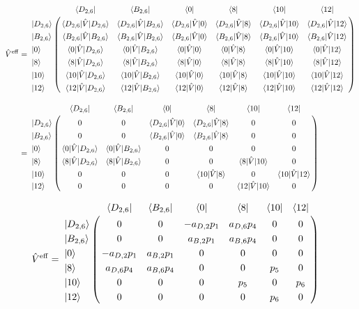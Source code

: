 \begin{align}
     \hat{V}^{\rm{eff}}&=\bordermatrix{
    & \bra{D_{2,6}}&  \bra{B_{2,6}} &\bra{0} &  \bra{8} &  \bra{10} &\bra{12}\cr
   \ket{D_{2,6}}&\langle{D_{2,6}|\hat{V}|D_{2,6}}\rangle&\langle{D_{2,6}|\hat{V}|B_{2,6}}\rangle
   &\langle{D_{2,6}|\hat{V}|0}\rangle&\langle{D_{2,6}|\hat{V}|8}\rangle
   &\langle{D_{2,6}|\hat{V}|10}\rangle&\langle{D_{2,6}|\hat{V}|12}\rangle\cr
\ket{B_{2,6}}&\langle{B_{2,6}|\hat{V}|B_{2,6}}\rangle&\langle{B_{2,6}|\hat{V}|B_{2,6}}\rangle
   &\langle{B_{2,6}|\hat{V}|0}\rangle&\langle{B_{2,6}|\hat{V}|8}\rangle
   &\langle{B_{2,6}|\hat{V}|10}\rangle&\langle{B_{2,6}|\hat{V}|12}\rangle\cr
  \ket{0}
  &\langle{0|\hat{V}|D_{2,6}}\rangle&\langle{0|\hat{V}|B_{2,6}}\rangle
  &\langle{0|\hat{V}|0}\rangle&\langle{0|\hat{V}|8}\rangle
  &\langle{0|\hat{V}|10}\rangle&\langle{0|\hat{V}|12}\rangle\cr
  \ket{8}
  &\langle{8|\hat{V}|D_{2,6}}\rangle&\langle{8|\hat{V}|B_{2,6}}\rangle
  &\langle{8|\hat{V}|0}\rangle&\langle{8|\hat{V}|8}\rangle
   &\langle{8|\hat{V}|10}\rangle
   &\langle{8|\hat{V}|12}\rangle\cr
  \ket{10}&\langle{10|\hat{V}|D_{2,6}}\rangle&\langle{10|\hat{V}|B_{2,6}}\rangle
   &\langle{10|\hat{V}|0}\rangle&\langle{10|\hat{V}|8}\rangle
   &\langle{10|\hat{V}|10}\rangle&\langle{10|\hat{V}|12}\rangle\cr
  \ket{12}&\langle{12|\hat{V}|D_{2,6}}\rangle&\langle{12|\hat{V}|B_{2,6}}\rangle
   &\langle{12|\hat{V}|0}\rangle&\langle{12|\hat{V}|8}\rangle
   &\langle{12|\hat{V}|10}\rangle&\langle{12|\hat{V}|12}\rangle\cr}
   \nn[10pt]
   &=\bordermatrix{
    & \bra{D_{2,6}}&  \bra{B_{2,6}} &\bra{0} &  \bra{8} &  \bra{10} &\bra{12}\cr
   \ket{D_{2,6}}&0&0
   &\langle{D_{2,6}|\hat{V}|0}\rangle&\langle{D_{2,6}|\hat{V}|8}\rangle
   &0&0\cr
\ket{B_{2,6}}&0&0
   &\langle{B_{2,6}|\hat{V}|0}\rangle&\langle{B_{2,6}|\hat{V}|8}\rangle
   &0&0\cr
  \ket{0}
  &\langle{0|\hat{V}|D_{2,6}}\rangle&\langle{0|\hat{V}|B_{2,6}}\rangle
  &0&0
  &0&0\cr
  \ket{8}
  &\langle{8|\hat{V}|D_{2,6}}\rangle&\langle{8|\hat{V}|B_{2,6}}\rangle
  &0&0
   &\langle{8|\hat{V}|10}\rangle
   &0\cr
  \ket{10}&0&0
   &0&\langle{10|\hat{V}|8}\rangle
   &0&\langle{10|\hat{V}|12}\rangle\cr
  \ket{12}&0&0
   &0&0
   &\langle{12|\hat{V}|10}\rangle&0\cr}
\end{align}


\begin{align}
     \hat{V}^{\rm{eff}}&=\bordermatrix{
    & \bra{D_{2,6}}&  \bra{B_{2,6}} &\bra{0} &  \bra{8} &  \bra{10} &\bra{12}\cr
   \ket{D_{2,6}}
   &0&0
   &-a_{D,2}p_1&a_{D,6}p_4
   &0&0\cr
\ket{B_{2,6}}&0&0
   &a_{B,2}p_1&a_{B,6}p_4
   &0&0\cr
  \ket{0}
  &-a_{D,2}p_1&a_{B,2}p_1
  &0&0
  &0&0\cr
  \ket{8}
  &a_{D,6}p_4&a_{B,6}p_4
  &0&0
   &p_5
   &0\cr
  \ket{10}&0&0
   &0&p_5
   &0&p_6\cr
  \ket{12}&0&0
   &0&0
   &p_6&0
   \cr}
\end{align}

